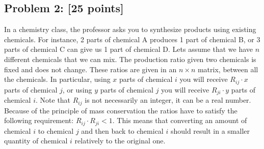 \documentclass[11pt]{article}
\begin{document}
\subsection*{Problem 2: [25 points]} In a chemistry class, the
professor asks you to synthesize products using existing
chemicals. For instance, 2 parts of chemical A produces 1 part of
chemical B, or 3 parts of chemical C can give us 1 part of chemical
D. Lets assume that we have $n$ different chemicals that we can
mix. The production ratio given two chemicals is fixed and does not
change. These ratios are given in an $n \times n$ matrix, between all
the chemicals. In particular, using $x$ parts of chemical $i$ you will
receive $R_{ij} \cdot x$ parts of chemical $j$, or using $y$ parts of
chemical $j$ you will receive $R_{ji} \cdot y$ parts of chemical
$i$. Note that $R_{ij}$ is not necessarily an integer, it can be a
real number.\\

\noindent Because of the principle of mass conservation the ratios
have to satisfy the following requirement: $R_{ij} \cdot R_{ji} <
1$. This means that converting an amount of chemical $i$ to chemical
$j$ and then back to chemical $i$ should result in a smaller quantity
of chemical $i$ relatively to the original one.\\
\end{document}
